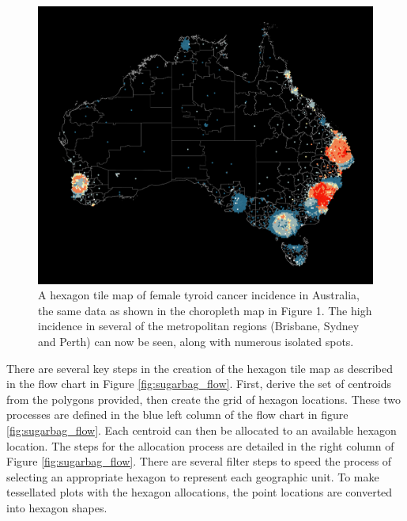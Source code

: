 \begin{Schunk}
\begin{figure}
\includegraphics[width=0.95\linewidth]{kobakian-cook_files/figure-latex/hexmap-1} \caption[A hexagon tile map of female tyroid cancer incidence in Australia, the same data as shown in the choropleth map in Figure 1]{A hexagon tile map of female tyroid cancer incidence in Australia, the same data as shown in the choropleth map in Figure 1. The high incidence in several of the metropolitan regions (Brisbane, Sydney and Perth) can now be seen, along with numerous isolated spots.}\label{fig:hexmap}
\end{figure}
\end{Schunk}

There are several key steps in the creation of the hexagon tile map as
described in the flow chart in Figure \ref{fig:sugarbag_flow}. First,
derive the set of centroids from the polygons provided, then create the
grid of hexagon locations. These two processes are defined in the blue
left column of the flow chart in figure \ref{fig:sugarbag_flow}. Each
centroid can then be allocated to an available hexagon location. The
steps for the allocation process are detailed in the right column of
Figure \ref{fig:sugarbag_flow}. There are several filter steps to speed
the process of selecting an appropriate hexagon to represent each
geographic unit. To make tessellated plots with the hexagon allocations,
the point locations are converted into hexagon shapes.

